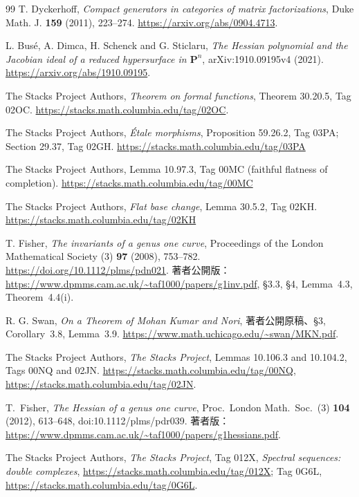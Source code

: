 \documentclass[a4paper,11pt]{ltjsarticle}
\theoremstyle{definition}
\begin{document}
\begin{thebibliography}{99}
T. Dyckerhoff,
\emph{Compact generators in categories of matrix factorizations},
Duke Math. J. \textbf{159} (2011), 223--274.
\url{https://arxiv.org/abs/0904.4713}.

L. Bus\'e, A. Dimca, H. Schenck and G. Sticlaru,
\emph{The Hessian polynomial and the Jacobian ideal of a reduced
hypersurface in $\mathbf P^n$}, arXiv:1910.09195v4 (2021).
\url{https://arxiv.org/abs/1910.09195}.

The Stacks Project Authors,
\emph{Theorem on formal functions}, Theorem 30.20.5, Tag 02OC.
\url{https://stacks.math.columbia.edu/tag/02OC}.


The Stacks Project Authors,
\emph{\'Etale morphisms}, Proposition 59.26.2, Tag 03PA;
Section 29.37, Tag 02GH.
\url{https://stacks.math.columbia.edu/tag/03PA}

The Stacks Project Authors,
Lemma 10.97.3, Tag 00MC (faithful flatness of completion).
\url{https://stacks.math.columbia.edu/tag/00MC}

The Stacks Project Authors,
\emph{Flat base change}, Lemma 30.5.2, Tag 02KH.
\url{https://stacks.math.columbia.edu/tag/02KH}

T. Fisher,
\emph{The invariants of a genus one curve},
Proceedings of the London Mathematical Society (3) \textbf{97} (2008), 753--782.
\url{https://doi.org/10.1112/plms/pdn021}.
著者公開版：\url{https://www.dpmms.cam.ac.uk/~taf1000/papers/g1inv.pdf},
\S3.3, \S4, Lemma~4.3, Theorem~4.4(i).

R. G. Swan,
\emph{On a Theorem of Mohan Kumar and Nori},
著者公開原稿、\S3, Corollary~3.8, Lemma~3.9.
\url{https://www.math.uchicago.edu/~swan/MKN.pdf}.

The Stacks Project Authors,
\emph{The Stacks Project},
Lemmas 10.106.3 and 10.104.2, Tags 00NQ and 02JN.
\url{https://stacks.math.columbia.edu/tag/00NQ},
\url{https://stacks.math.columbia.edu/tag/02JN}.


T.~Fisher,
\emph{The Hessian of a genus one curve},
Proc.\ London Math.\ Soc.\ (3) \textbf{104} (2012), 613--648,
doi:10.1112/plms/pdr039.
著者版：\url{https://www.dpmms.cam.ac.uk/~taf1000/papers/g1hessians.pdf}.

The Stacks Project Authors,
\emph{The Stacks Project},
Tag 012X, \emph{Spectral sequences: double complexes},
\url{https://stacks.math.columbia.edu/tag/012X};
Tag 0G6L,
\url{https://stacks.math.columbia.edu/tag/0G6L}.


\end{thebibliography}
\end{document}
